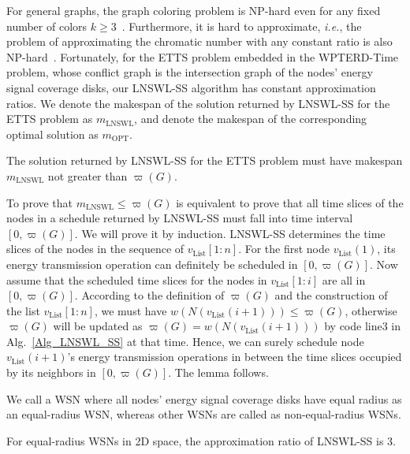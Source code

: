 \documentclass[12pt,journal,onecolumn,draftcls]{IEEEtran}
\begin{document}
For general graphs, the graph coloring problem is NP-hard even for any fixed number of colors $k{\geq}3$~\cite{Garey1979}. Furthermore, it is hard to approximate, \textit{i.e.}, the problem of approximating the chromatic number with any constant ratio is also NP-hard~\cite{Arora1998}. Fortunately, for the ETTS problem embedded in the WPTERD-Time problem, whose conflict graph is the intersection graph of the nodes' energy signal coverage disks, our LNSWL-SS algorithm has constant approximation ratios. We denote the makespan of the solution returned by LNSWL-SS for the ETTS problem as $m_\text{LNSWL}$, and denote the makespan of the corresponding optimal solution as $m_\text{OPT}$.

\begin{lemma}
\label{lemma_valid_solution}
The solution returned by LNSWL-SS for the ETTS problem must have makespan $m_\text{LNSWL}$ not greater than $\varpi(G)$.
\end{lemma}

\begin{IEEEproof}
To prove that $m_\text{LNSWL}{\leq}\varpi(G)$ is equivalent to prove that all time slices of the nodes in a schedule returned by LNSWL-SS must fall into time interval $[0,\varpi(G)]$. We will prove it by induction. LNSWL-SS determines the time slices of the nodes in the sequence of $v_\text{List}[1{:}n]$. For the first node $v_\text{List}(1)$, its energy transmission operation can definitely be scheduled in $[0,\varpi(G)]$. Now assume that the scheduled time slices for the nodes in $v_\text{List}[1{:}i]$ are all in $[0,\varpi(G)]$. According to the definition of $\varpi(G)$ and the construction of the list $v_\text{List}[1{:}n]$, we must have $w(N(v_\text{List}(i{+}1))){\leq}\varpi(G)$, otherwise $\varpi(G)$ will be updated as $\varpi(G){=}w(N(v_\text{List}(i{+}1)))$ by code line3 in Alg.~\ref{Alg_LNSWL_SS} at that time. Hence, we can surely schedule node $v_\text{List}(i{+}1)$'s energy transmission operations in between the time slices occupied by its neighbors in $[0,\varpi(G)]$. The lemma follows.
\end{IEEEproof}

We call a WSN where all nodes' energy signal coverage disks have equal radius as an equal-radius WSN, whereas other WSNs are called as non-equal-radius WSNs.

\begin{lemma}
\label{lemma_2d_ratio3}
For equal-radius WSNs in 2D space, the approximation ratio of LNSWL-SS is 3.
\end{lemma}
\end{document}
